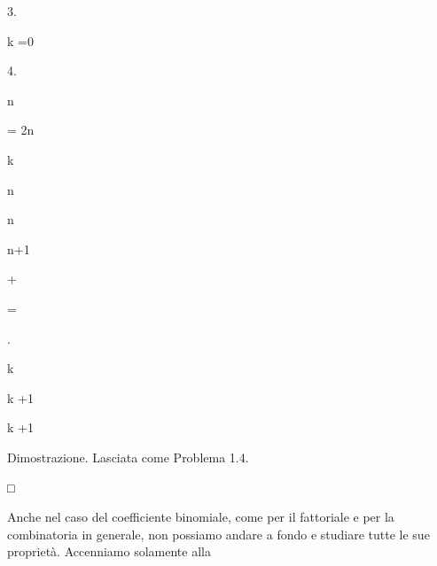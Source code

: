 \documentclass[a4paper,portrait,12pt]{article}
\begin{document}
3.


\begin{flushleft}
k =0
\end{flushleft}





4.





\begin{flushleft}
n
\end{flushleft}


\begin{flushleft}
= 2n
\end{flushleft}


\begin{flushleft}
k
\end{flushleft}





\begin{flushleft}
n
\end{flushleft}


\begin{flushleft}
n
\end{flushleft}


\begin{flushleft}
n+1
\end{flushleft}


+


=


.


\begin{flushleft}
k
\end{flushleft}


\begin{flushleft}
k +1
\end{flushleft}


\begin{flushleft}
k +1
\end{flushleft}





\begin{flushleft}
Dimostrazione. Lasciata come Problema 1.4.
\end{flushleft}





□





\begin{flushleft}
Anche nel caso del coefficiente binomiale, come per il fattoriale e per la combinatoria in generale, non possiamo andare a fondo e studiare tutte le sue propriet\`{a}. Accenniamo solamente alla
\end{flushleft}
\end{document}
